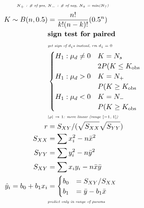 \documentclass{article}
\newcommand{\note}[1]{\tiny\smash{\textit{#1}}}
\begin{document}
\begin{minipage}{0.48\textwidth}
	\begin{align*}
		\note{$N_{+}$ : \# of pos, } & \note{$N_{-}$ : \# of neg, $N_{s}$ = min($N_{?}$)} \\
		K \sim B(n,0.5) &= \frac{n!}{k!(n-k)!}(0.5^n) \\
		&\textbf{sign test for paired} \\
		&\note{get sign of $d_i$s instead, rm $d_i = 0$} \\
		&
		\begin{cases}
			H_1 : \mu_d \ne 0 & K = N_s \\
				& 2 P(K \le K_{\text{obs}} \\
			H_1 : \mu_d > 0 & K = N_+ \\
				& P(K \ge K_{\text{obs}} \\
			H_1 : \mu_d < 0 & K = N_- \\
				& P(K \ge K_{\text{obs}} \\
		\end{cases} \quad \\
		&\note{$|\rho| \to 1$: more linear (range $[-1,1]$)} \\
		r &= S_{XY} / ( \sqrt{S_{XX}} \sqrt{S_{YY}} ) \\
		S_{XX} &= \sum x_i^2 - n\bar{x}^2 \\
		S_{YY} &= \sum y_i^2 - n\bar{y}^2 \\
		S_{XY} &= \sum x_i y_i - n\bar{x}\bar{y} \\
		\hat y_i = b_0 + b_1 x_i &=
		\begin{cases}
			b_0 &= S_{XY} / S_{XX} \\
			b_1 &= \bar{y} - b_1 \bar{x}
		\end{cases} \\
		&\note{predict only in range of params} \\~\\
	\end{align*}
\end{minipage}
\end{document}
